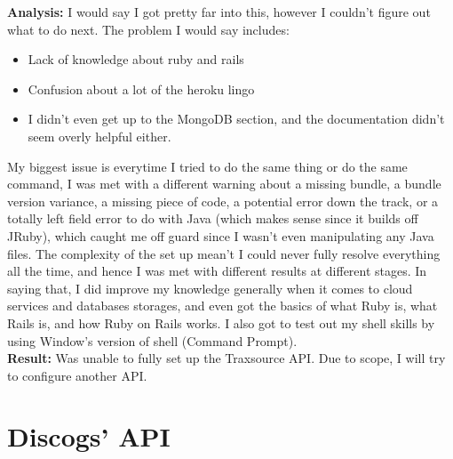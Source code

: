 \documentclass{article}
\begin{document}
\textbf{Analysis:} I would say I got pretty far into this, however I couldn't figure out what to do next. The problem I would say includes:
\begin{itemize}
    \item Lack of knowledge about ruby and rails
    \item Confusion about a lot of the heroku lingo
    \item I didn't even get up to the MongoDB section, and the documentation didn't seem overly helpful either.
\end{itemize}
My biggest issue is everytime I tried to do the same thing or do the same command, I was met with a different warning about a missing bundle, a bundle version variance, a missing piece of code, a potential error down the track, or a totally left field error to do with Java (which makes sense since it builds off JRuby), which caught me off guard since I wasn't even manipulating any Java files. The complexity of the set up mean't I could never fully resolve everything all the time, and hence I was met with different results at different stages.
In saying that, I did improve my knowledge generally when it comes to cloud services and databases storages, and even got the basics of what Ruby is, what Rails is, and how Ruby on Rails works. I also got to test out my shell skills by using Window's version of shell (Command Prompt).\\
\textbf{Result:} Was unable to fully set up the Traxsource API. Due to scope, I will try to configure another API.
\section{Discogs' API}
\end{document}
